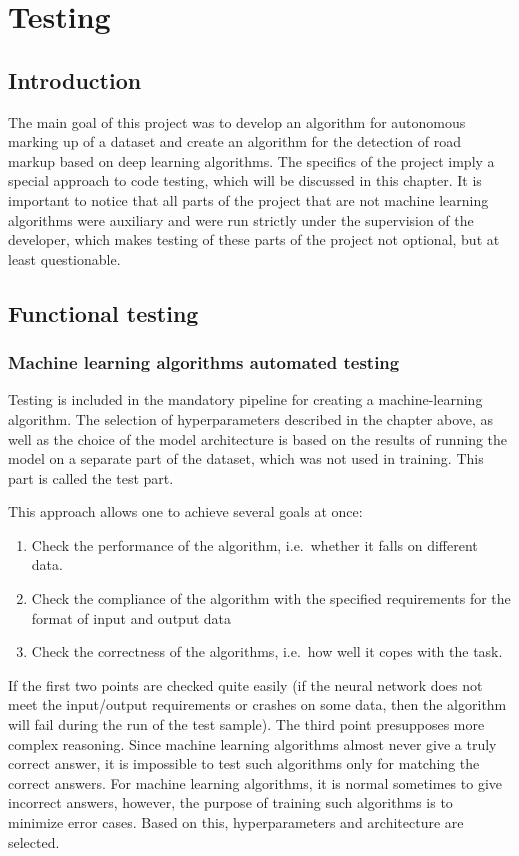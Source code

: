 \section{Testing}
\subsection{Introduction}
The main goal of this project was to develop an algorithm for autonomous marking up of a dataset and create an algorithm for the detection of road markup based
on deep learning algorithms. The specifics of the project imply a special approach to code testing, which will be discussed in this chapter. It is important to 
notice that all parts of the project that are not machine learning algorithms were auxiliary and were run strictly under the supervision of the developer, which
makes testing of these parts of the project not optional, but at least questionable.

\subsection{Functional testing}
\subsubsection{Machine learning algorithms automated testing}

Testing is included in the mandatory pipeline for creating a machine-learning algorithm. The selection of hyperparameters described in the chapter above, 
as well as the choice of the model architecture is based on the results of running the model on a separate part of the dataset, which was not used in training. 
This part is called the test part.

This approach allows one to achieve several goals at once:
\begin{enumerate}
    \item Check the performance of the algorithm, i.e.\ whether it falls on different data.
    \item Check the compliance of the algorithm with the specified requirements for the format of input and output data
    \item Check the correctness of the algorithms, i.e.\ how well it copes with the task.
\end{enumerate} 
If the first two points are checked quite easily (if the neural network does not meet the input/output requirements or crashes on some data, then the algorithm will 
fail during the run of the test sample). The third point presupposes more complex reasoning. Since machine learning algorithms almost never give
a truly correct answer, it is impossible to test such algorithms only for matching the correct answers. For machine learning algorithms, it is normal sometimes 
to give incorrect answers, however, the purpose of training such algorithms is to minimize error cases. Based on this, hyperparameters and architecture are selected. 


